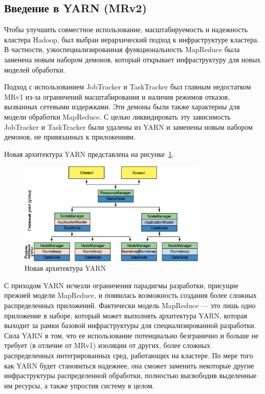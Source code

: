 \subsection{Введение в YARN (MRv2)}
Чтобы улучшить совместное использование, масштабируемость и надежность кластера Hadoop, был выбран иерархический подход к инфраструктуре кластера. В частности, узкоспециализированная функциональность MapReduce была заменена новым набором демонов, который открывает инфраструктуру для новых моделей обработки.

Подход с использованием JobTracker и TaskTracker был главным недостатком MRv1 из-за ограничений масштабирования и наличия режимов отказов, вызванных сетевыми издержками. Эти демоны были также характерны для модели обработки MapReduce. С целью ликвидировать эту зависимость JobTracker и TaskTracker были удалены из YARN и заменены новым набором демонов, не привязанных к приложениям.

Новая архитектура YARN представлена на рисунке~\ref{fig:yarn_arch}.

\begin{figure}[H]
    \centering
    \includegraphics[width=0.8\textwidth]{yarn_arch}
    \caption{Новая архитектура YARN}
    \label{fig:yarn_arch}
\end{figure}

С приходом YARN исчезли ограничения парадигмы разработки, присущие прежней модели MapReduce, и появилась возможность создания более сложных распределенных приложений. Фактически модель MapReduce --- это лишь одно приложение в наборе, который может выполнять архитектура YARN, которая выходит за рамки базовой инфраструктуры для специализированной разработки. Сила YARN в том, что ее использование потенциально безгранично и больше не требует (в отличие от MRv1) изоляции от других, более сложных распределенных интегрированных сред, работающих на кластере. По мере того как YARN будет становиться надежнее, она сможет заменить некоторые другие инфраструктуры распределенной обработки, полностью высвободив выделенные им ресурсы, а также упростив систему в целом.

